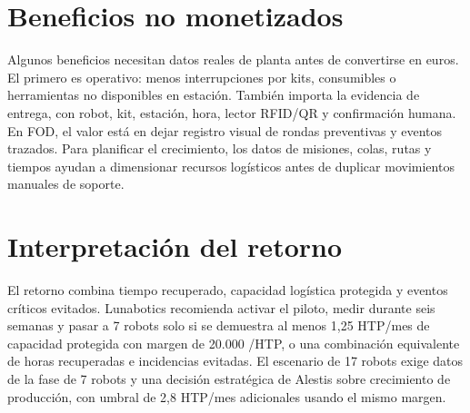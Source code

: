 \section{Beneficios no monetizados}

Algunos beneficios necesitan datos reales de planta antes de convertirse en euros. El primero es operativo: menos interrupciones por kits, consumibles o herramientas no disponibles en estación. También importa la evidencia de entrega, con robot, kit, estación, hora, lector RFID/QR y confirmación humana. En FOD, el valor está en dejar registro visual de rondas preventivas y eventos trazados. Para planificar el crecimiento, los datos de misiones, colas, rutas y tiempos ayudan a dimensionar recursos logísticos antes de duplicar movimientos manuales de soporte.

\section{Interpretación del retorno}

El retorno combina tiempo recuperado, capacidad logística protegida y eventos críticos evitados. Lunabotics recomienda activar el piloto, medir durante seis semanas y pasar a 7 robots solo si se demuestra al menos 1,25 HTP/mes de capacidad protegida con margen de 20.000 \texteuro{}/HTP, o una combinación equivalente de horas recuperadas e incidencias evitadas. El escenario de 17 robots exige datos de la fase de 7 robots y una decisión estratégica de Alestis sobre crecimiento de producción, con umbral de 2,8 HTP/mes adicionales usando el mismo margen.
